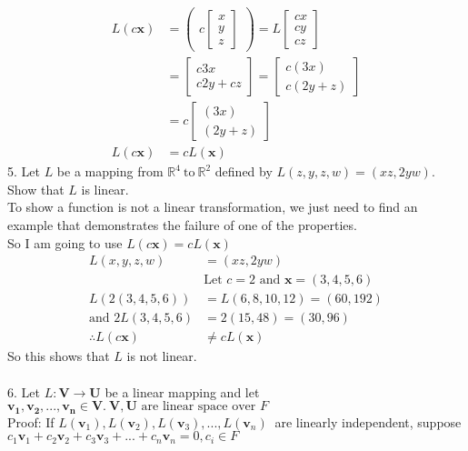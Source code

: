 \documentclass[10pt,a4paper]{article}
\numberwithin{equation}{section}
\begin{document}
\begin{align*}
L(c\mathbf{x})&=\begin{pmatrix}c\begin{bmatrix}
	x\\
	y\\
	z
\end{bmatrix}\end{pmatrix} =L\begin{bmatrix}
cx\\
cy\\
cz
\end{bmatrix} \\ 
&=\begin{bmatrix}
	c3x \\
	c2y+cz
\end{bmatrix} = \begin{bmatrix}
c(3x) \\
c(2y+z)
\end{bmatrix} \\
&= c\begin{bmatrix}
	(3x) \\
	(2y+z)
\end{bmatrix} \\
L(c\mathbf{x})&=cL(\mathbf{x})
\end{align*}
5. Let $L$ be a mapping from $\mathbb{R}^4~ \text{to}~ \mathbb{R}^2$ defined by $L(z,y,z,w)=(xz,2yw)$. Show that $L$ is linear. \\
To show a function is not a linear transformation, we just need to find an example that demonstrates the failure of one of the properties. \\
So I am going to use $L(c\mathbf{x})=cL(\mathbf{x})$ \\
\begin{align*}
	L(x,y,z,w)&=(xz,2yw) \\
	&\text{Let } c = 2 \text{ and } \mathbf{x}=(3,4,5,6)\\
	L(2(3,4,5,6))&=L(6,8,10,12)=(60,192) \\
\text{and } 
	2L(3,4,5,6)&=2(15,48)=(30,96) \\
	\therefore L(c\mathbf{x}) & \neq cL(\mathbf{x}) 
\end{align*}
So this shows that $L$ is not linear. \\
~\\
6. Let $L: \mathbf{V} \longrightarrow \mathbf{U}$ be a linear mapping and let $\mathbf{v_1,v_2,...,v_n \in V}.~ \mathbf{V,U} \text{ are linear space over } F$ \\
Proof: If $L(\mathbf{v}_{1}),L(\mathbf{v}_{2}),L(\mathbf{v}_{3}),...,L(\mathbf{v}_{n})~$ are linearly independent, suppose $c_{1}\mathbf{v}_{1}+c_{2}\mathbf{v}_{2}+c_{3}\mathbf{v}_{3}+...+c_{n}\mathbf{v}_{n}=0,c_{i} \in F$ \\
\end{document}
